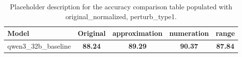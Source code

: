 \begin{table}[ht]
\centering
{}
\small
\begin{tabular}{lcccc}
\hline
Model & Original & approximation & numeration & range \\
\hline
qwen3\_32b\_baseline & \textbf{88.24} & \textbf{89.29} & \textbf{90.37} & \textbf{87.84} \\
\hline
\end{tabular}
\caption{Placeholder description for the accuracy comparison table populated with original\_normalized, perturb\_type1.}
\end{table}
